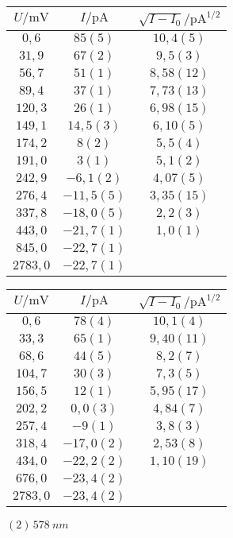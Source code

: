 \begin{figure}[htbp]
   \centering
\parbox{0.475\linewidth}{\centering
\begin{tabular}{c c c}
\hline$U / \unit{\milli\volt}$ & $I / \unit{\pico\ampere}$ & $\sqrt{I-I_0} / \unit{\pico\ampere\tothe{1/2}}$ \\ 
\hline
$0,6$ & $85(5)$ & $10,4(5)$ \\
$31,9$ & $67(2)$ & $9,5(3)$ \\
$56,7$ & $51(1)$ & $8,58(12)$ \\
$89,4$ & $37(1)$ & $7,73(13)$ \\
$120,3$ & $26(1)$ & $6,98(15)$ \\
$149,1$ & $14,5(3)$ & $6,10(5)$ \\
$174,2$ & $8(2)$ & $5,5(4)$ \\
$191,0$ & $3(1)$ & $5,1(2)$ \\
$242,9$ & $-6,1(2)$ & $4,07(5)$ \\
$276,4$ & $-11,5(5)$ & $3,35(15)$ \\
$337,8$ & $-18,0(5)$ & $2,2(3)$ \\
$443,0$ & $-21,7(1)$ & $1,0(1)$ \\
$845,0$ & $-22,7(1)$ &    \\
$2783,0$ & $-22,7(1)$ &    \\
\hline\end{tabular}
\caption{$(1)\,\SI{578}{nm}$}
}\quad\parbox{0.475\linewidth}{\centering
\begin{tabular}{c c c}
\hline$U / \unit{\milli\volt}$ & $I / \unit{\pico\ampere}$ & $\sqrt{I-I_0} / \unit{\pico\ampere\tothe{1/2}}$ \\ 
\hline
$0,6$ & $78(4)$ & $10,1(4)$ \\
$33,3$ & $65(1)$ & $9,40(11)$ \\
$68,6$ & $44(5)$ & $8,2(7)$ \\
$104,7$ & $30(3)$ & $7,3(5)$ \\
$156,5$ & $12(1)$ & $5,95(17)$ \\
$202,2$ & $0,0(3)$ & $4,84(7)$ \\
$257,4$ & $-9(1)$ & $3,8(3)$ \\
$318,4$ & $-17,0(2)$ & $2,53(8)$ \\
$434,0$ & $-22,2(2)$ & $1,10(19)$ \\
$676,0$ & $-23,4(2)$ &    \\
$2783,0$ & $-23,4(2)$ &    \\
\hline\end{tabular}
\caption{$(2)\,\SI{578}{nm}$}
}\end{figure}
